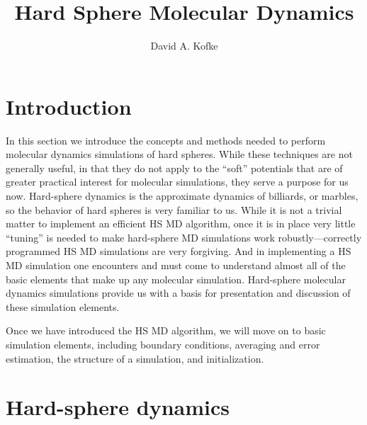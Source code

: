 \documentclass[9pt,bestpractices]{molsim}
\title{Hard Sphere Molecular Dynamics}
\author[1*]{David A. Kofke}
\affil[1]{University at Buffalo}
\begin{document}
\maketitle


\section{Introduction}

In this section we introduce the concepts and methods needed to perform
molecular dynamics simulations of hard spheres. While these techniques
are not generally useful, in that they do not apply to the ``soft''
potentials that are of greater practical interest for molecular simulations, they serve a purpose
for us now. Hard-sphere dynamics is the approximate dynamics of billiards, or
marbles, so the behavior of hard spheres is very familiar to us. While it is not a
trivial matter to implement an efficient HS MD algorithm, once it is in
place very little ``tuning'' is needed to make hard-sphere MD
simulations work robustly---correctly programmed HS MD simulations are
very forgiving. And in implementing a HS MD simulation one
encounters and must come to understand almost all of the basic elements
that make up any molecular simulation. Hard-sphere molecular dynamics
simulations provide us with a basis for presentation and discussion of
these simulation elements.

Once we have introduced the HS MD algorithm, we will move on to basic
simulation elements, including boundary conditions, averaging and error
estimation, the structure of a simulation, and initialization.

\section{Hard-sphere dynamics}\label{hard-sphere-dynamics}
\end{document}
